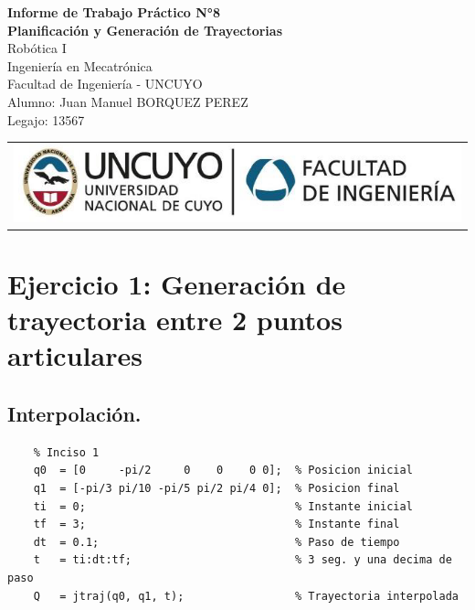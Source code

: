 \documentclass[a4paper,12pt]{article}
\begin{document}
\begin{titlepage}
    \centering
    \vspace*{5cm}
    {\Huge\bfseries Informe de Trabajo Práctico N°8}\\
    \vspace{0.2cm}
    {\Large \textbf{Planificación y Generación de Trayectorias}}\\
    \vspace{0.5cm}
    {\Large Robótica I}\\
    \vspace{0.5 cm}
    {\Large Ingeniería en Mecatrónica}\\
    \vspace{0.2 cm}
    {\Large Facultad de Ingeniería - UNCUYO}\\
    \vspace{1.5cm}
    Alumno: Juan Manuel BORQUEZ PEREZ\\
    Legajo: 13567\\
    \vfill
    {\begin{tabular}{@{}c@{}}\includegraphics[scale=0.4]{escudo.PNG}\end{tabular}}\hspace{10pt}
\end{titlepage}

\section{Ejercicio 1:  Generación de trayectoria entre 2 puntos articulares}
\subsection{Interpolación.}
\begin{lstlisting}
    % Inciso 1
    q0  = [0     -pi/2     0    0    0 0];  % Posicion inicial
    q1  = [-pi/3 pi/10 -pi/5 pi/2 pi/4 0];  % Posicion final
    ti  = 0;                                % Instante inicial
    tf  = 3;                                % Instante final
    dt  = 0.1;                              % Paso de tiempo
    t   = ti:dt:tf;                         % 3 seg. y una decima de paso
    Q   = jtraj(q0, q1, t);                 % Trayectoria interpolada
\end{lstlisting}
\end{document}

